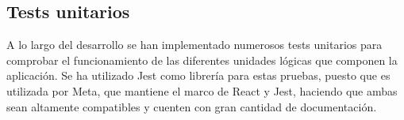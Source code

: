 \subsection{Tests unitarios}
\label{tec_hab:tests}

A lo largo del desarrollo se han implementado numerosos tests unitarios para comprobar el funcionamiento de las diferentes unidades lógicas que componen la aplicación. Se ha utilizado Jest como librería para estas pruebas, puesto que es utilizada por Meta, que mantiene el marco de React y Jest, haciendo que ambas sean altamente compatibles y cuenten con gran cantidad de documentación.
